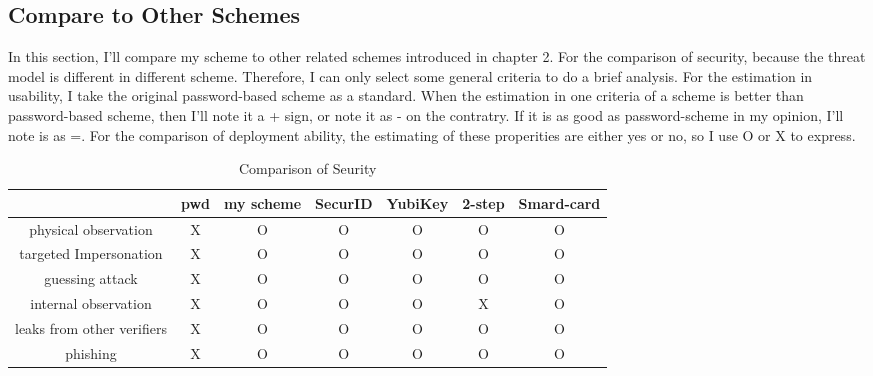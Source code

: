 \begin{CJK}{Bg5}{bsmi}


\chapter{Compare to Other Schemes}

In this section, I'll compare my scheme to other related schemes introduced in chapter 2. For the comparison of security, because the threat model is different in different scheme. Therefore, I can only select some general criteria to do a brief analysis. For the estimation in usability, I take the original password-based scheme as a standard. When the estimation in one criteria of a scheme is better than password-based scheme, then I'll note it a + sign, or note it as - on the contratry. If it is as good as password-scheme in my opinion, I'll note is as =. For the comparison of deployment ability, the estimating of these properities are either yes or no, so I use O or X to express.

\begin{table}[h]
\begin{tabular}{|c|c|c|c|c|c|c|}
\hline
                                     & pwd & my scheme & SecurID & YubiKey & 2-step & Smard-card \\ \hline
physical observation       & X   & O         & O       & O       & O       & O          \\ \hline
targeted Impersonation     & X   & O         & O       & O       & O       & O          \\ \hline
guessing attack            & X   & O         & O       & O       & O       & O          \\ \hline
internal observation       & X   & O         & O       & O       & X       & O          \\ \hline
leaks from other verifiers & X   & O         & O       & O       & O       & O          \\ \hline
phishing                   & X   & O         & O       & O       & O       & O          \\ \hline
\end{tabular}
\caption{Comparison of Seurity}
\end{table}


\end{CJK}
